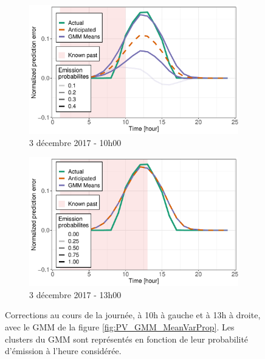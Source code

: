 \documentclass[12pt, french]{report}
\begin{document}
\begin{figure}[htbp]
	\begin{subfigure}[b]{0.5\linewidth}
		\centering
		\includegraphics[width=0.9\linewidth]{Images/PV/GMM/GMM_6Clust_Intraday_24d_10h_idtest336.pdf} 
		\caption{3 décembre 2017 - 10h00} 
	\end{subfigure}%
	\begin{subfigure}[b]{0.5\linewidth}
		\centering
		\includegraphics[width=0.9\linewidth]{Images/PV/GMM/GMM_6Clust_Intraday_24d_13h_idtest336.pdf}
		\caption{3 décembre 2017 - 13h00} 
	\end{subfigure}
	
	\caption{Corrections au cours de la journée, à 10h à gauche et à 13h à droite, avec le GMM de la figure \ref{fig:PV_GMM_MeanVarProp}. Les clusters du GMM sont représentés en fonction de leur probabilité d'émission à l'heure considérée. }
	\label{fig:PV_GMM_IntraDay} 
\end{figure}
\end{document}
